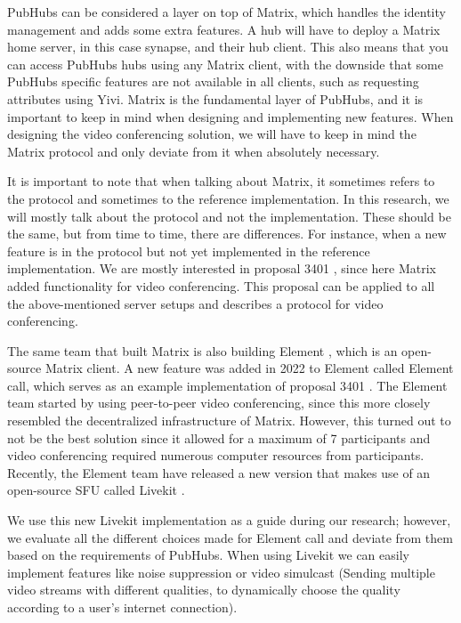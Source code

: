\documentclass{report}
\begin{document}
PubHubs can be considered a layer on top of Matrix, which handles the identity management and adds some extra features.
A hub will have to deploy a Matrix home server, in this case synapse, and their hub client. This also means that you can
access PubHubs hubs using any Matrix client, with the downside that some PubHubs specific features are not available in
all clients, such as requesting attributes using Yivi. Matrix is the fundamental layer of PubHubs, and it is
important to keep in mind when designing and implementing new features. When designing the video conferencing
solution, we will have to keep in mind the Matrix protocol and only deviate from it when absolutely necessary.

It is important to note that when talking about Matrix, it sometimes refers to the protocol and sometimes to the
reference implementation. In this research, we will mostly talk about the protocol and not the implementation. These
should be the same, but from time to time, there are differences. For instance, when a new feature is in the protocol
but not yet implemented in the reference implementation. We are mostly interested in proposal 3401 \cite{
noauthor_matrix-spec-proposalsproposals3401-group-voipmd_nodate}, since here Matrix added functionality for video conferencing. This proposal
can be applied to all the above-mentioned server setups and describes a protocol for video conferencing.

The same team that built Matrix is also building Element \cite{noauthor_element_nodate}, which is an open-source Matrix client.
A new feature was added in 2022 \cite{noauthor_introducing_2022} to Element called Element call, which serves as an
example implementation of proposal 3401 \cite{noauthor_matrix-spec-proposalsproposals3401-group-voipmd_nodate}.
The Element team started by using peer-to-peer video conferencing, since this more closely resembled the decentralized
infrastructure of Matrix. However, this turned out to not be the best solution since it allowed for a maximum of 7
participants and video conferencing required numerous computer  resources from participants. Recently, the Element team
have released a new version that makes use of an open-source SFU called Livekit \cite{noauthor_livekit_nodate}.

We use this new Livekit implementation as a guide during our research; however, we evaluate all the different
choices made for Element call and deviate from them based on the requirements of PubHubs. When using Livekit we can
easily implement features like noise suppression or video simulcast (Sending multiple video streams with different
qualities, to dynamically choose the quality according to a user's internet connection).
\end{document}
